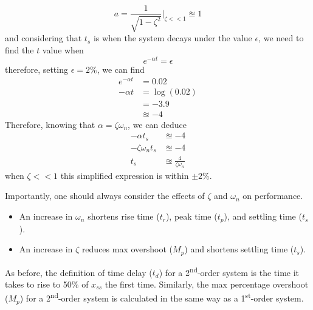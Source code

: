 \documentclass[12pt,letter]{article}
\begin{document}
\begin{equation}
a = \frac{1}{\sqrt{1-\zeta^2}}\bigg|_{\zeta << 1} \approxeq 1
\end{equation}
and considering that $t_s$ is when the system decays under the value $\epsilon$, we need to find the $t$ value when
\begin{equation}
e^{- \alpha t} = \epsilon
\end{equation}
therefore, setting $\epsilon =2\%$, we can find
\begin{align}
e^{- \alpha t} &= 0.02 \\
- \alpha t &= \log(0.02) \\
&= -3.9 \nonumber \\
&\approxeq -4 \nonumber
\end{align}
Therefore, knowing that $\alpha = \zeta \omega_n$, we can deduce
\begin{align}
- \alpha t_s &\approxeq -4 \\
- \zeta \omega_n t_s &\approxeq -4 \nonumber \\
t_s &\approxeq \frac{4}{\zeta \omega_n} \nonumber
\end{align}
when $\zeta << 1$ this simplified expression is within $\pm 2\%$.

Importantly, one should always consider the effects of $\zeta$ and $\omega_n$ on performance. 
\begin{itemize}
\item An increase in $\omega_n$ shortens rise time ($t_r$), peak time ($t_p$), and settling time ($t_s$).
\item An increase in $\zeta$ reduces max overshoot ($M_p$) and shortens settling time ($t_s$).
\end{itemize}

As before, the definition of time delay ($t_d$) for a 2\textsuperscript{nd}-order system  is the time it takes to rise to 50\% of $x_{ss}$ the first time. Similarly, the max percentage overshoot ($M_p$) for a 2\textsuperscript{nd}-order system is calculated in the same way as a 1\textsuperscript{st}-order system.
\end{document}
